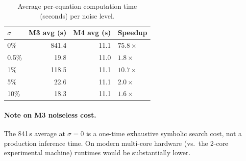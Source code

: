 \begin{table}[H]
\centering
\caption{Average per-equation computation time (seconds) per noise level.}
\label{tab:time_noise}
\small
\begin{tabular}{lrrl}
\toprule
$\sigma$ & \textcolor{m3blue}{M3 avg (s)} & \textcolor{m4red}{M4 avg (s)} & Speedup\\
\midrule
0\%   & 841.4 & 11.1 & $\mathbf{75.8\times}$\\
0.5\% &  19.8 & 11.0 & $1.8\times$\\
1\%   & 118.5 & 11.1 & $\mathbf{10.7\times}$\\
5\%   &  22.6 & 11.1 & $2.0\times$\\
10\%  &  18.3 & 11.1 & $1.6\times$\\
\bottomrule
\end{tabular}
\end{table}

\paragraph{Note on M3 noiseless cost.}
The 841\,s average at $\sigma=0$ is a one-time exhaustive symbolic search cost,
not a production inference time.  On modern multi-core hardware (vs.\ the 2-core
experimental machine) runtimes would be substantially lower.
